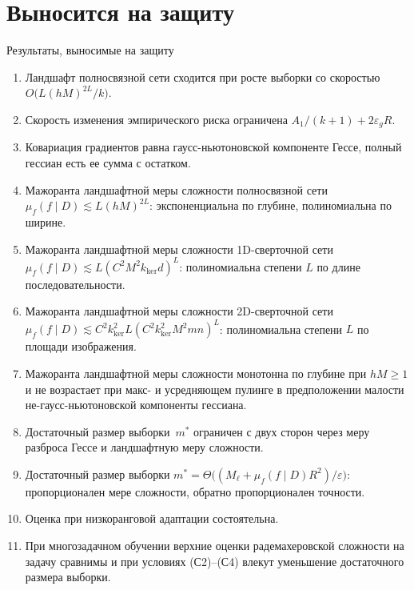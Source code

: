 \documentclass[9pt,pdf,hyperref={unicode}]{beamer}
\begin{document}
\section{Выносится на защиту}
\begin{frame}{Результаты, выносимые на защиту}
\justifying
\footnotesize
\begin{enumerate}
    \justifying
    \setlength{\itemsep}{-2pt}
    \item Ландшафт полносвязной сети сходится при росте выборки со скоростью $O\bigl(L(hM)^{2L}/k\bigr)$.
    \item Скорость изменения эмпирического риска ограничена $A_1/(k+1)+2\varepsilon_gR$.
    \item Ковариация градиентов равна гаусс-ньютоновской компоненте Гессе, полный гессиан есть ее сумма с остатком.
    \item Мажоранта ландшафтной меры сложности полносвязной сети $\mu_f(f\mid D)\lesssim L(hM)^{2L}$: экспоненциальна по глубине, полиномиальна по ширине.
    \item Мажоранта ландшафтной меры сложности 1D-сверточной сети $\mu_f(f\mid D)\lesssim L(C^2M^2k_{\mathrm{ker}}d)^{L}$: полиномиальна степени $L$ по длине последовательности.
    \item Мажоранта ландшафтной меры сложности 2D-сверточной сети $\mu_f(f\mid D)\lesssim C^2k_{\mathrm{ker}}^2L(C^2k_{\mathrm{ker}}^2M^2mn)^{L}$: полиномиальна степени $L$ по площади изображения.
    \item Мажоранта ландшафтной меры сложности монотонна по глубине при $hM\ge1$ и не возрастает при макс- и усредняющем пулинге в предположении малости не-гаусс-ньютоновской компоненты гессиана.
    \item Достаточный размер выборки~$m^*$ ограничен с двух сторон через меру разброса Гессе и ландшафтную меру сложности.
    \item Достаточный размер выборки $m^*=\Theta\bigl((M_\ell+\mu_f(f\mid D)R^2)/\varepsilon\bigr)$: пропорционален мере сложности, обратно пропорционален точности.
    \item Оценка при низкоранговой адаптации состоятельна.
    \item При многозадачном обучении верхние оценки радемахеровской сложности на задачу сравнимы и при условиях (С2)–(С4) влекут уменьшение достаточного размера выборки.
\end{enumerate}
\end{frame}
\end{document}
